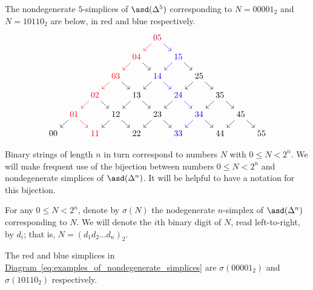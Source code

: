 \documentclass[main.tex]{subfiles}
\begin{document}
\begin{example}
  The nondegenerate $5$-simplices of $\asd(\Delta^{5})$ corresponding to $N = 00001_{2}$ and $N = 10110_{2}$ are below, in red and blue respectively.
  \begin{equation}
    \label{eq:examples_of_nondegenerate_simplices}
    \begin{tikzcd}[column sep=tiny, row sep=small]
      &&&&& \color{purple}{05}
      \arrow[dl, color=red]
      \arrow[dr, color=blue]
      \\
      &&&& \color{red}{04}
      \arrow[dl, color=red]
      \arrow[dr]
      && \color{blue}{15}
      \arrow[dl, color=blue]
      \arrow[dr]
      \\
      &&& \color{red}{03}
      \arrow[dl, red]
      \arrow[dr]
      && \color{blue}{14}
      \arrow[dl]
      \arrow[dr, color=blue]
      && 25
      \arrow[dl]
      \arrow[dr]
      \\
      && \color{red}{02}
      \arrow[dl, red]
      \arrow[dr]
      && 13
      \arrow[dl]
      \arrow[dr]
      && \color{blue}{24}
      \arrow[dl]
      \arrow[dr, color=blue]
      && 35
      \arrow[dl]
      \arrow[dr]
      \\
      & \color{red}{01}
      \arrow[dl]
      \arrow[dr, color=red]
      && 12
      \arrow[dl]
      \arrow[dr]
      && 23
      \arrow[dl]
      \arrow[dr]
      && \color{blue}{34}
      \arrow[dl, color=blue]
      \arrow[dr]
      && 45
      \arrow[dl]
      \arrow[dr]
      \\
      00
      && \color{red}{11}
      && 22
      && \color{blue}{33}
      && 44
      && 55
    \end{tikzcd}
  \end{equation}
\end{example}

Binary strings of length $n$ in turn correspond to numbers $N$ with $0 \leq N < 2^{n}$. We will make frequent use of the bijection between numbers $0 \leq N < 2^{n}$ and nondegenerate simplices of $\asd(\Delta^{n})$. It will be helpful to have a notation for this bijection.

\begin{notation}
  For any $0 \leq N < 2^{n}$, denote by $\sigma(N)$ the nodegenerate $n$-simplex of $\asd(\Delta^{n})$ corresponding to $N$. We will denote the $i$th binary digit of $N$, read left-to-right, by $d_{i}$; that is, $N = (d_{1}d_{2}\ldots d_{n})_{2}$.
\end{notation}

\begin{example}
  The red and blue simplices in \hyperref[eq:examples_of_nondegenerate_simplices]{Diagram~\ref*{eq:examples_of_nondegenerate_simplices}} are $\sigma(00001_{2})$ and $\sigma(10110_{2})$ respectively.
\end{example}
\end{document}
